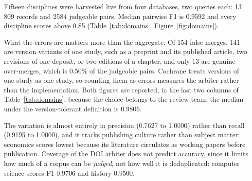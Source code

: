 \documentclass[final,5p,times,twocolumn]{elsarticle}
\begin{document}
Fifteen disciplines were harvested live from four databases, two queries each:
13\,809 records and 2584 judgeable pairs. Median pairwise F1 is 0.9592 and
every discipline scores above 0.85 (Table~\ref{tab:domains},
Figure~\ref{fig:domains}).

What the errors are matters more than the aggregate. Of 154 false merges, 141
are version variants of one study, such as a preprint and its published
article, two revisions of one deposit, or two editions of a chapter, and only
13 are genuine over-merges, which is 0.50\% of the judgeable pairs. Cochrane
treats versions of one study as one study, so counting them as errors measures
the arbiter rather than the implementation. Both figures are reported, in the
last two columns of Table~\ref{tab:domains}, because the choice belongs to the
review team; the median under the version-tolerant definition is 0.9806.

The variation is almost entirely in precision (0.7627 to 1.0000) rather than
recall (0.9195 to 1.0000), and it tracks publishing culture rather than
subject matter: economics scores lowest because its literature circulates as
working papers before publication. Coverage of the DOI arbiter does not
predict accuracy, since it limits how much of a corpus can be \emph{judged},
not how well it is deduplicated: computer science scores F1 0.9706 and history
0.9500.
\end{document}
